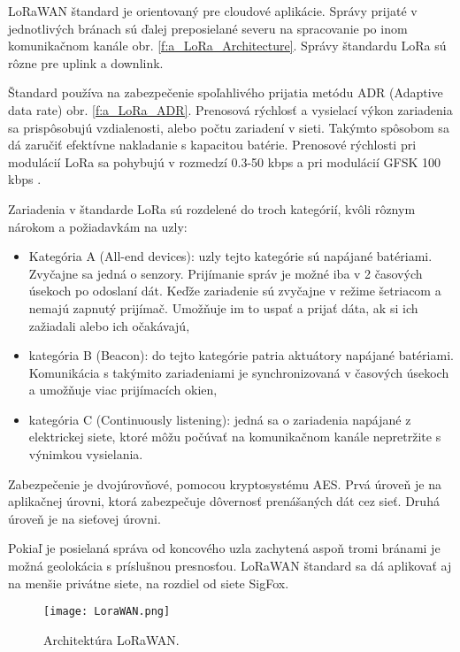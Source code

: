 \documentclass[12pt,a4paper,oneside,openright]{report}
\begin{document}
LoRaWAN štandard je orientovaný pre cloudové aplikácie. Správy prijaté v jednotlivých bránach sú ďalej preposielané severu na spracovanie po inom komunikačnom kanále obr. \ref{f:a_LoRa_Architecture}.
Správy štandardu LoRa sú rôzne pre uplink a downlink.

Štandard používa na zabezpečenie spoľahlivého prijatia metódu ADR (Adaptive data rate) obr. \ref{f:a_LoRa_ADR}. Prenosová rýchlosť a vysielací výkon zariadenia sa prispôsobujú vzdialenosti, alebo počtu zariadení v sieti. Takýmto spôsobom sa dá zaručiť efektívne nakladanie s kapacitou batérie. Prenosové rýchlosti pri modulácií LoRa sa pohybujú v rozmedzí 0.3-50 kbps a pri modulácií GFSK 100 kbps \cite{LoRaFAQ}.

Zariadenia v štandarde LoRa sú rozdelené do troch kategórií, kvôli rôznym nárokom a požiadavkám na uzly:
\begin{itemize}
	\item Kategória A (All-end devices): uzly tejto kategórie sú napájané batériami. Zvyčajne sa jedná o senzory. Prijímanie správ je možné iba v 2 časových úsekoch po odoslaní dát. Keďže zariadenie sú zvyčajne v režime šetriacom a nemajú zapnutý prijímač. Umožňuje im to uspať a prijať dáta, ak si ich zažiadali alebo ich očakávajú,
	\item kategória B (Beacon): do tejto kategórie patria aktuátory napájané batériami. Komunikácia s takýmito zariadeniami je synchronizovaná v časových úsekoch a umožňuje viac prijímacích okien,
	\item kategória C (Continuously listening): jedná sa o zariadenia napájané z elektrickej siete, ktoré môžu počúvať na komunikačnom kanále nepretržite s výnimkou vysielania.
\end{itemize}

Zabezpečenie je dvojúrovňové, pomocou kryptosystému AES. Prvá úroveň je na aplikačnej úrovni, ktorá zabezpečuje dôvernosť prenášaných dát cez sieť. Druhá úroveň je na sieťovej úrovni.

Pokiaľ je posielaná správa od koncového uzla zachytená aspoň tromi bránami je možná geolokácia s príslušnou presnosťou. LoRaWAN štandard sa dá aplikovať aj na menšie privátne siete, na rozdiel od siete SigFox.

\begin{figure*}[!htb]
	\centering
	\texttt{[image: LoraWAN.png]}
	\caption{Architektúra LoRaWAN\cite{LoRaOverview}.}
	\label{f:a_LoRaWAN}
\end{figure*}
\end{document}
